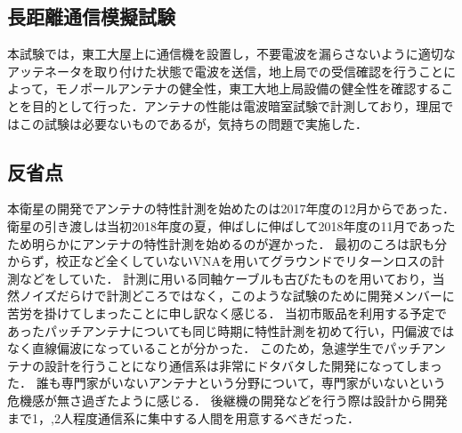 \subsection{長距離通信模擬試験}
本試験では，東工大屋上に通信機を設置し，不要電波を漏らさないように適切なアッテネータを取り付けた状態で電波を送信，地上局での受信確認を行うことによって，モノポールアンテナの健全性，東工大地上局設備の健全性を確認することを目的として行った．アンテナの性能は電波暗室試験で計測しており，理屈ではこの試験は必要ないものであるが，気持ちの問題で実施した．

\subsection{反省点}
本衛星の開発でアンテナの特性計測を始めたのは2017年度の12月からであった．
衛星の引き渡しは当初2018年度の夏，伸ばしに伸ばして2018年度の11月であったため明らかにアンテナの特性計測を始めるのが遅かった．
最初のころは訳も分からず，校正など全くしていないVNAを用いてグラウンドでリターンロスの計測などをしていた．
計測に用いる同軸ケーブルも古びたものを用いており，当然ノイズだらけで計測どころではなく，このような試験のために開発メンバーに苦労を掛けてしまったことに申し訳なく感じる．
当初市販品を利用する予定であったパッチアンテナについても同じ時期に特性計測を初めて行い，円偏波ではなく直線偏波になっていることが分かった．
このため，急遽学生でパッチアンテナの設計を行うことになり通信系は非常にドタバタした開発になってしまった．
誰も専門家がいないアンテナという分野について，専門家がいないという危機感が無さ過ぎたように感じる．
後継機の開発などを行う際は設計から開発まで1，,2人程度通信系に集中する人間を用意するべきだった．

